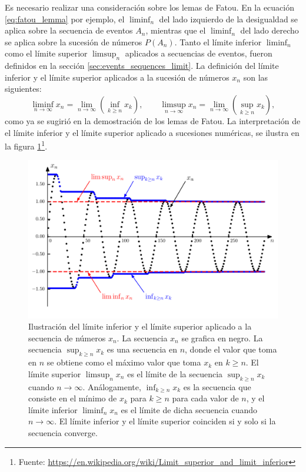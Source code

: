 \documentclass[a4paper]{report}
\begin{document}
Es necesario realizar una consideración sobre los lemas de Fatou. En la ecuación \ref{eq:fatou_lemma} por ejemplo, el \(\liminf_n\) del lado izquierdo de la desigualdad se aplica sobre la secuencia de eventos \(A_n\), mientras que el \(\liminf_n\) del lado derecho se aplica sobre la sucesión de números \(P(A_n)\). Tanto el límite inferior \(\liminf_n\) como el límite superior \(\limsup_n\) aplicados a secuencias de eventos, fueron definidos en la sección \ref{sec:events_sequences_limit}. La definición del límite inferior y el límite superior aplicados a la sucesión de números \(x_n\) son las siguientes:
\[
 \liminf_{n\to\infty}x_n=\lim_{n\to\infty}\left(\inf_{k\geq n} x_k\right),\qquad
 \limsup_{n\to\infty}x_n=\lim_{n\to\infty}\left(\sup_{k\geq n} x_k\right),
\]
como ya se sugirió en la demostración de los lemas de Fatou. La interpretación de el límite inferior y el límite superior aplicado a sucesiones numéricas, se ilustra en la figura \ref{fig:liminf_limsup}\footnote{Fuente: \url{https://en.wikipedia.org/wiki/Limit_superior_and_limit_inferior}}.
\begin{figure}[!htb]
\begin{center}
\includegraphics[width=0.8\columnwidth]{figuras/liminf_limsup.pdf}
\caption{\label{fig:liminf_limsup} Ilustración del límite inferior y el límite superior aplicado a la secuencia de números \(x_n\). La secuencia \(x_n\) se grafica en negro. La secuencia \(\sup_{k\geq n} x_k\) es una secuencia en \(n\), donde el valor que toma en \(n\) se obtiene como el máximo valor que toma \(x_k\) en \(k\geq n\). El límite superior \(\limsup_n x_n\) es el límite de la secuencia \(\sup_{k\geq n} x_k\) cuando \(n\to\infty\). Análogamente, \(\inf_{k\geq n} x_k\) es la secuencia que consiste en el mínimo de \(x_k\) para \(k\geq n\) para cada valor de \(n\), y el límite inferior \(\liminf_n x_n\) es el límite de dicha secuencia cuando \(n\to\infty\). El límite inferior y el límite superior coinciden si y solo si la secuencia converge.}
\end{center}
\end{figure}
\end{document}
